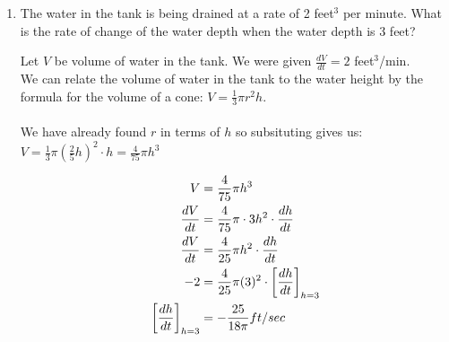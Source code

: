 \documentclass[nooutcomes]{ximera}
\begin{document}
\begin{problem}
\begin{enumerate}
	\item The water in the tank is being drained at a rate of 2 feet$^3$ per minute.  What is the rate of change of the water depth when the water depth is 3 feet?

	\begin{freeResponse}
	Let $V$ be volume of water in the tank.  We were given $\frac{dV}{dt}=2$ feet$^3$/min. \\
	We can relate the volume of water in the tank to the water height by the formula for the volume of a cone: $V=\frac{1}{3}\pi r^2 h$. \\\\
	We have already found $r$ in terms of $h$ so subsituting gives us:  $V=\frac{1}{3}\pi \left(\frac{2}{5}h\right)^2\cdot h=\frac{4}{75}\pi h^3$
	
	\begin{align*}
	V&=\frac{4}{75}\pi h^3\\
	\frac{dV}{dt}&=\frac{4}{75}\pi \cdot 3h^2 \cdot \frac{dh}{dt} \\
	\frac{dV}{dt}&=\frac{4}{25}\pi h^2 \cdot \frac{dh}{dt} \\
	-2&=\frac{4}{25}\pi (3)^2 \cdot \bigg[ \frac{dh}{dt} \bigg]_{h=3} \\
	\bigg[ \frac{dh}{dt} \bigg]_{h=3}&=-\frac{25}{18 \pi} ft/sec
	\end{align*}


\end{freeResponse}
\end{enumerate}
\end{problem}
\end{document}
